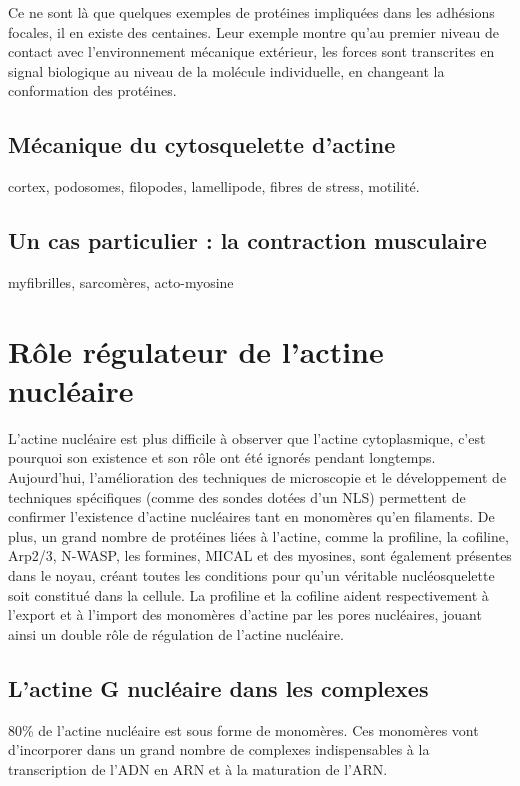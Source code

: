 Ce ne sont là que quelques exemples de protéines impliquées dans les adhésions focales, il en existe des centaines. Leur exemple montre qu'au premier niveau de contact avec l'environnement mécanique extérieur, les forces sont transcrites en signal biologique au niveau de la molécule individuelle, en changeant la conformation des protéines. 



\subsection{Mécanique du cytosquelette d'actine}
cortex, podosomes, filopodes, lamellipode, fibres de stress, motilité. 
\subsection{Un cas particulier : la contraction musculaire}
myfibrilles, sarcomères, acto-myosine

\section{Rôle régulateur de l'actine nucléaire}

L'actine nucléaire est plus difficile à observer que l'actine cytoplasmique, c'est pourquoi son existence et son rôle ont été ignorés pendant longtemps. 
Aujourd'hui, l'amélioration des techniques de microscopie et le développement de techniques spécifiques (comme des sondes dotées d'un NLS) permettent de confirmer l'existence d'actine nucléaires tant en monomères qu'en filaments. 
De plus, un grand nombre de protéines liées à l'actine, comme la profiline, la cofiline, Arp2/3, N-WASP, les formines, MICAL et des myosines, sont également présentes dans le noyau, créant toutes les conditions pour qu'un véritable nucléosquelette soit constitué dans la cellule. 
La profiline et la cofiline aident respectivement à l'export et à l'import des monomères d'actine par les pores nucléaires, jouant ainsi un double rôle de régulation de l'actine nucléaire. 


\subsection{L'actine G nucléaire dans les complexes}

80\% de l'actine nucléaire est sous forme de monomères. Ces monomères vont d'incorporer dans un grand nombre de complexes indispensables à la transcription de l'ADN en ARN et à la maturation de l'ARN. 

